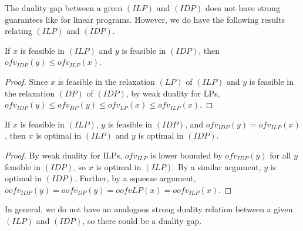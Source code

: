 The duality gap between a given $(ILP)$ and $(IDP)$ does not have strong guarantees like for linear programs. However, we do have the following results relating $(ILP)$ and $(IDP)$.

\begin{thm}
    \label{thm:weak-duality-ILP}
    If $x$ is feasible in $(ILP)$ and $y$ is feasible in $(IDP)$, then $ofv_{IDP}(y) \le ofv_{ILP}(x)$.
    
    \begin{proof}
        Since $x$ is feasible in the relaxation $(LP)$ of $(ILP)$ and $y$ is feasible in the relaxation $(DP)$ of $(IDP)$, by weak duality for LPs, $ofv_{IDP}(y) \le ofv_{DP}(y) \le ofv_{LP}(x) \le ofv_{ILP}(x)$.
    \end{proof}
\end{thm}

\begin{thm}
    \label{thm:supervisor-principle-ILP}
    If $x$ is feasible in $(ILP)$, $y$ is feasible in $(IDP)$, and $ofv_{IDP}(y) = ofv_{ILP}(x)$, then $x$ is optimal in $(ILP)$ and $y$ is optimal in $(IDP)$.
    
    \begin{proof}
        By weak duality for ILPs, $ofv_{ILP}$ is lower bounded by $ofv_{IDP}(y)$ for all $y$ feasible in $(IDP)$, so $x$ is optimal in $(ILP)$. By a similar argument, $y$ is optimal in $(IDP)$. Further, by a squeeze argument, $oofv_{IDP}(y) = oofv_{DP}(y) = oofv{LP}(x) = oofv_{ILP}(x)$.
    \end{proof}
\end{thm}

In general, we do not have an analogous strong duality relation between a given $(ILP)$ and $(IDP)$, so there could be a duality gap.

